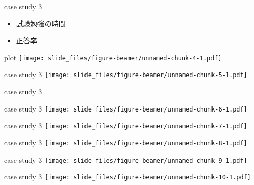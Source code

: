 \documentclass[
  ignorenonframetext,
  aspectratio=169]{beamer}
\begin{document}
\begin{frame}{case study 3}
\protect\hypertarget{case-study-3-1}{}
\Huge

\begin{itemize}
\item[\textbullet] 試験勉強の時間
\item[\textbullet] 正答率
\end{itemize}
\pause
\vspace*{-55pt}
\end{frame}

\begin{frame}{plot}
\protect\hypertarget{plot}{}
\texttt{[image: slide\_files/figure-beamer/unnamed-chunk-4-1.pdf]}
\end{frame}

\begin{frame}{case study 3}
\protect\hypertarget{case-study-3-2}{}
\texttt{[image: slide\_files/figure-beamer/unnamed-chunk-5-1.pdf]}
\end{frame}

\begin{frame}{case study 3}
\protect\hypertarget{case-study-3-3}{}
\end{frame}

\begin{frame}{case study 3}
\protect\hypertarget{case-study-3-4}{}
\texttt{[image: slide\_files/figure-beamer/unnamed-chunk-6-1.pdf]}
\end{frame}

\begin{frame}{case study 3}
\protect\hypertarget{case-study-3-5}{}
\texttt{[image: slide\_files/figure-beamer/unnamed-chunk-7-1.pdf]}
\end{frame}

\begin{frame}{case study 3}
\protect\hypertarget{case-study-3-6}{}
\texttt{[image: slide\_files/figure-beamer/unnamed-chunk-8-1.pdf]}
\end{frame}

\begin{frame}{case study 3}
\protect\hypertarget{case-study-3-7}{}
\texttt{[image: slide\_files/figure-beamer/unnamed-chunk-9-1.pdf]}
\end{frame}

\begin{frame}{case study 3}
\protect\hypertarget{case-study-3-8}{}
\texttt{[image: slide\_files/figure-beamer/unnamed-chunk-10-1.pdf]}
\end{frame}
\end{document}
